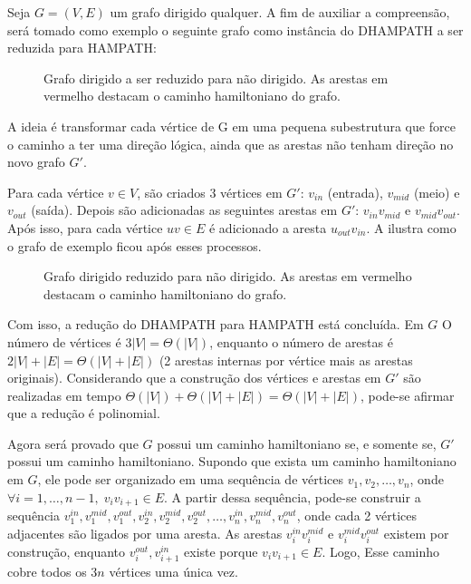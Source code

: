 Seja $G=(V,E)$ um grafo dirigido qualquer. A fim de auxiliar a compreensão, será tomado como exemplo o seguinte grafo como instância do DHAMPATH a ser reduzida para HAMPATH:

\begin{figure}[H]
    \centering
    
    \caption{Grafo dirigido a ser reduzido para não dirigido. As arestas em vermelho destacam o caminho hamiltoniano do grafo.}
    \label{fig:chd-para-chnd_grafo_exemplo}
\end{figure}

\noindent A ideia é transformar cada vértice de G em uma pequena subestrutura que force o caminho a ter uma direção lógica, ainda que as arestas não tenham direção no novo grafo $G'$.

Para cada vértice $v\in V$, são criados 3 vértices em $G'$: $v_{in}$ (entrada), $v_{mid}$ (meio) e $v_{out}$ (saída). Depois são adicionadas as seguintes arestas em $G'$: $v_{in}v_{mid}$ e $v_{mid}v_{out}$. Após isso, para cada vértice $uv\in E$ é adicionado a aresta $u_{out}v_{in}$. A  ilustra como o grafo de exemplo ficou após esses processos.

\begin{figure}[H]
    \centering
    
    \caption{Grafo dirigido reduzido para não dirigido. As arestas em vermelho destacam o caminho hamiltoniano do grafo.}
    \label{fig:chd-para-chnd_grafo_reduzido}
\end{figure}

Com isso, a redução do DHAMPATH para HAMPATH está concluída. Em $G$ O número de vértices é $3|V|=\Theta(|V|)$, enquanto o número de arestas é $2|V|+|E|=\Theta(|V|+|E|)$ (2 arestas internas por vértice mais as arestas originais). Considerando que a construção dos vértices e arestas em $G'$ são realizadas em tempo $\Theta(|V|)+\Theta(|V|+|E|)=\Theta(|V|+|E|)$, pode-se afirmar que a redução é polinomial.

Agora será provado que $G$ possui um caminho hamiltoniano se, e somente se, $G'$ possui um caminho hamiltoniano. Supondo que exista um caminho hamiltoniano em $G$, ele pode ser organizado em uma sequência de vértices $v_1,v_2,\ldots,v_n$, onde $\forall i=1,\ldots,n-1,\;v_iv_{i+1}\in E$. A partir dessa sequência, pode-se construir a sequência $v_{1}^{in},v_{1}^{mid},v_{1}^{out},v_{2}^{in},v_{2}^{mid},v_{2}^{out},\ldots,v_{n}^{in},v_{n}^{mid},v_{n}^{out}$, onde cada 2 vértices adjacentes são ligados por uma aresta. As arestas $v_{i}^{in}v_{i}^{mid}$ e $v_{i}^{mid}v_{i}^{out}$ existem por construção, enquanto $v_{i}^{out},v_{i+1}^{in}$ existe porque $v_iv_{i+1}\in E$. Logo, Esse caminho cobre todos os $3n$ vértices uma única vez.

